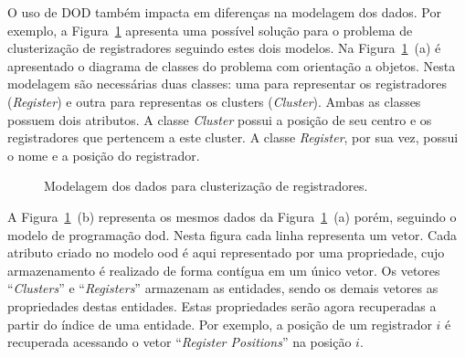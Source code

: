 O uso de DOD também impacta em diferenças na modelagem dos dados. Por exemplo, a Figura~\ref{fig:modelo_register_clustering} apresenta uma possível solução para o problema de clusterização de registradores seguindo estes dois modelos.
Na Figura~\ref{fig:modelo_register_clustering}~(a) é apresentado o diagrama de classes do problema com orientação a objetos. Nesta modelagem são necessárias duas classes: uma para representar os registradores (\textit{Register}) e outra para representas os clusters (\textit{Cluster}). Ambas as classes possuem dois atributos. A classe \textit{Cluster} possui a posição de seu centro e os registradores que pertencem a este cluster. A classe \textit{Register}, por sua vez, possui o nome e a posição do registrador.

\begin{figure}[h!t]
    \centering
    \caption{Modelagem dos dados para clusterização de registradores.}
    \label{fig:modelo_register_clustering}
\end{figure}


A Figura~\ref{fig:modelo_register_clustering}~(b) representa os mesmos dados da Figura~\ref{fig:modelo_register_clustering}~(a) porém, seguindo o modelo de programação \ac{dod}.
Nesta figura cada linha representa um vetor.
Cada atributo criado no modelo \ac{ood} é aqui representado por uma propriedade, cujo armazenamento é realizado de forma contígua em um único vetor.
Os vetores ``\textit{Clusters}'' e ``\textit{Registers}'' armazenam as entidades, sendo os demais vetores as propriedades destas entidades.
Estas propriedades serão agora recuperadas a partir do índice de uma entidade.
Por exemplo, a posição de um registrador $i$ é recuperada acessando o vetor ``\textit{Register Positions}'' na posição $i$.

